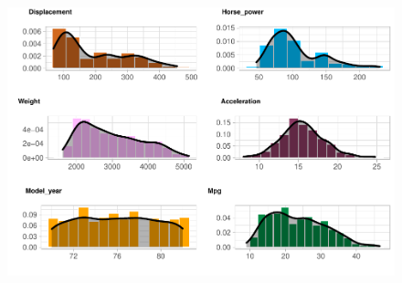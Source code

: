 \begin{figure}[H]\includegraphics[width=.9\linewidth]{img/EDA_files/figure-latex/unnamed-chunk-7-7} \caption{}\end{figure}

